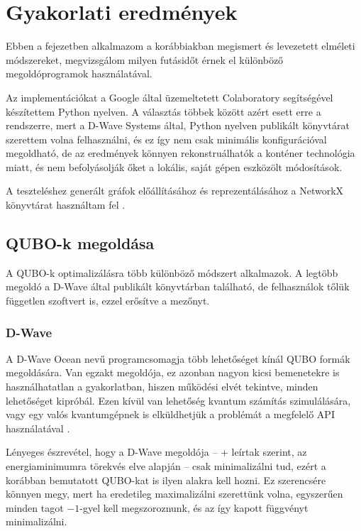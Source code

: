 
\chapter{Gyakorlati eredmények}\label{chap:practice}
Ebben a fejezetben alkalmazom a korábbiakban megismert és levezetett elméleti módszereket, megvizsgálom milyen futásidőt érnek el különböző megoldóprogramok használatával.

Az implementációkat a Google által üzemeltetett Colaboratory segítségével készítettem Python nyelven. A választás többek között azért esett erre a rendszerre, mert a D-Wave Systems által, Python nyelven publikált könyvtárat szerettem volna felhasználni, és ez így nem csak minimális konfigurációval megoldható, de az eredmények könnyen rekonstruálhatók a konténer technológia miatt, és nem befolyásolják őket a lokális, saját gépen eszközölt módosítások.

A teszteléshez generált gráfok előállításához és reprezentálásához a NetworkX könyvtárat használtam fel \cite{NetworkX}.

\section{QUBO-k megoldása}

A QUBO-k optimalizálásra több különböző módszert alkalmazok. A legtöbb megoldó a D-Wave által publikált könyvtárban található, de felhasználok tőlük független szoftvert is, ezzel erősítve a mezőnyt. 

\subsection{D-Wave}\label{sec:practiceDwave}

A D-Wave Ocean nevű programcsomagja több lehetőséget kínál QUBO formák megoldására. Van egzakt megoldója, ez azonban nagyon kicsi bemenetekre is használhatatlan a gyakorlatban, hiszen működési elvét tekintve, minden lehetőséget kipróbál. Ezen kívül van lehetőség kvantum számítás szimulálására, vagy egy valós kvantumgépnek is elküldhetjük a problémát a megfelelő API használatával \cite{DWaveOcean}.

Lényeges észrevétel, hogy a D-Wave megoldója -- \az+ leírtak szerint, az energiaminimumra törekvés elve alapján -- csak minimalizálni tud, ezért a korábban bemutatott QUBO-kat is ilyen alakra kell hozni. Ez szerencsére könnyen megy, mert ha eredetileg maximalizálni szerettünk volna, egyszerűen minden tagot $-1$-gyel kell megszoroznunk, és az így kapott függvényt minimalizálni.

